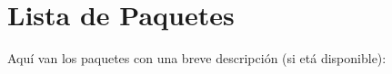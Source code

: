 \section{Lista de Paquetes }
Aquí van los paquetes con una breve descripción (si etá disponible):\begin{DoxyCompactList}
\item{}
\end{DoxyCompactList}
